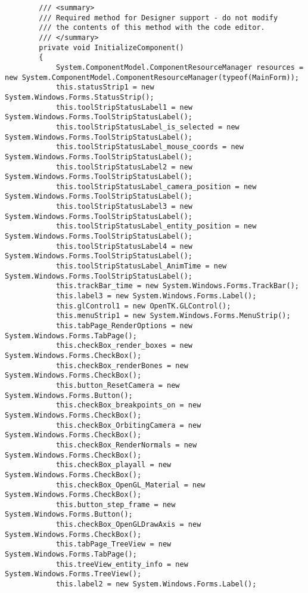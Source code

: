 \begin{scriptsize}
\begin{verbatim}
        /// <summary>
        /// Required method for Designer support - do not modify
        /// the contents of this method with the code editor.
        /// </summary>
        private void InitializeComponent()
        {
            System.ComponentModel.ComponentResourceManager resources = new System.ComponentModel.ComponentResourceManager(typeof(MainForm));
            this.statusStrip1 = new System.Windows.Forms.StatusStrip();
            this.toolStripStatusLabel1 = new System.Windows.Forms.ToolStripStatusLabel();
            this.toolStripStatusLabel_is_selected = new System.Windows.Forms.ToolStripStatusLabel();
            this.toolStripStatusLabel_mouse_coords = new System.Windows.Forms.ToolStripStatusLabel();
            this.toolStripStatusLabel2 = new System.Windows.Forms.ToolStripStatusLabel();
            this.toolStripStatusLabel_camera_position = new System.Windows.Forms.ToolStripStatusLabel();
            this.toolStripStatusLabel3 = new System.Windows.Forms.ToolStripStatusLabel();
            this.toolStripStatusLabel_entity_position = new System.Windows.Forms.ToolStripStatusLabel();
            this.toolStripStatusLabel4 = new System.Windows.Forms.ToolStripStatusLabel();
            this.toolStripStatusLabel_AnimTime = new System.Windows.Forms.ToolStripStatusLabel();
            this.trackBar_time = new System.Windows.Forms.TrackBar();
            this.label3 = new System.Windows.Forms.Label();
            this.glControl1 = new OpenTK.GLControl();
            this.menuStrip1 = new System.Windows.Forms.MenuStrip();
            this.tabPage_RenderOptions = new System.Windows.Forms.TabPage();
            this.checkBox_render_boxes = new System.Windows.Forms.CheckBox();
            this.checkBox_renderBones = new System.Windows.Forms.CheckBox();
            this.button_ResetCamera = new System.Windows.Forms.Button();
            this.checkBox_breakpoints_on = new System.Windows.Forms.CheckBox();
            this.checkBox_OrbitingCamera = new System.Windows.Forms.CheckBox();
            this.checkBox_RenderNormals = new System.Windows.Forms.CheckBox();
            this.checkBox_playall = new System.Windows.Forms.CheckBox();
            this.checkBox_OpenGL_Material = new System.Windows.Forms.CheckBox();
            this.button_step_frame = new System.Windows.Forms.Button();
            this.checkBox_OpenGLDrawAxis = new System.Windows.Forms.CheckBox();
            this.tabPage_TreeView = new System.Windows.Forms.TabPage();
            this.treeView_entity_info = new System.Windows.Forms.TreeView();
            this.label2 = new System.Windows.Forms.Label();

\end{verbatim}
\end{scriptsize}
